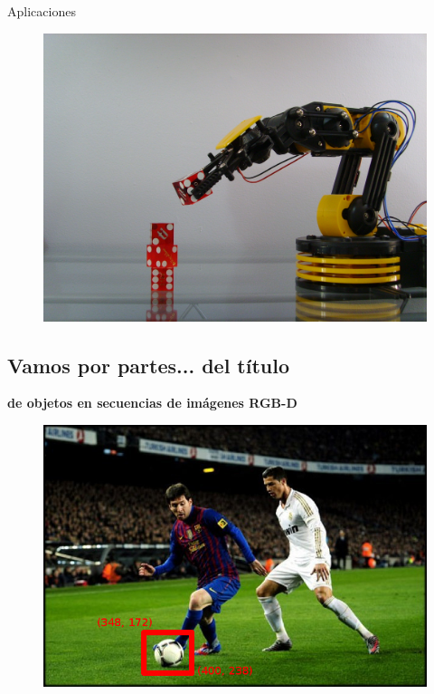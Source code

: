 \documentclass[]{beamer}
\begin{document}
\begin{frame}{Aplicaciones}
    \begin{figure}[t]
        \centering
        \includegraphics[scale=0.12]{img/robot.jpg}
    \end{figure}
\end{frame}

\subsection{Vamos por partes... del título}
\begin{frame}{}
    \textbf{ de objetos en secuencias de imágenes RGB-D}
    \begin{figure}[t]
        \centering
        \includegraphics[scale=0.45]{img/seguimiento_ejemplo.jpg}
    \end{figure}
\end{frame}
\end{document}
